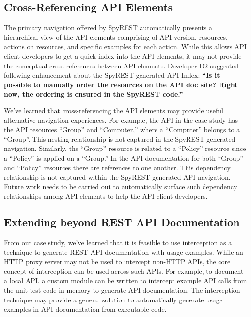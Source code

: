 \documentclass[10pt, conference]{IEEEtran}
\begin{document}
\subsection{Cross-Referencing API Elements}
The primary navigation offered by SpyREST automatically presents a hierarchical view of the API elements comprising of API version, resources, actions on resources, and specific examples for each action. While this allows API client developers to get a quick index into the API elements, it may not provide the conceptual cross-references between API elements. Developer D2 suggested following enhancement about the SpyREST generated API Index: \textbf{``Is it possible to manually order the resources on the API doc site? Right now, the ordering is ensured in the SpyREST code.''}

We've learned that cross-referencing the API elements may provide useful alternative navigation experiences. For example, the API in the case study has the API resources ``Group'' and ``Computer,'' where a ``Computer'' belongs to a ``Group''. This nesting relationship is not captured in the SpyREST generated navigation. Similarly, the ``Group'' resource is related to a ``Policy'' resource since a ``Policy'' is applied on a ``Group.'' In the API documentation for both ``Group'' and ``Policy'' resources there are references to one another. This dependency relationship is not captured within the SpyREST generated API navigation. Future work needs to be carried out to automatically surface such dependency relationships among API elements to help the API client developers.


\subsection{Extending beyond REST API Documentation}
From our case study, we've learned that it is feasible to use interception as a technique to generate REST API documentation with usage examples. While an HTTP proxy server may not be used to intercept non-HTTP APIs, the core concept of interception can be used across such APIs. For example, to document a local API, a custom module can be written to intercept example API calls from the unit test code in memory to generate API documentation. The interception technique may provide a general solution to automatically generate usage examples in API documentation from executable code.
\end{document}
